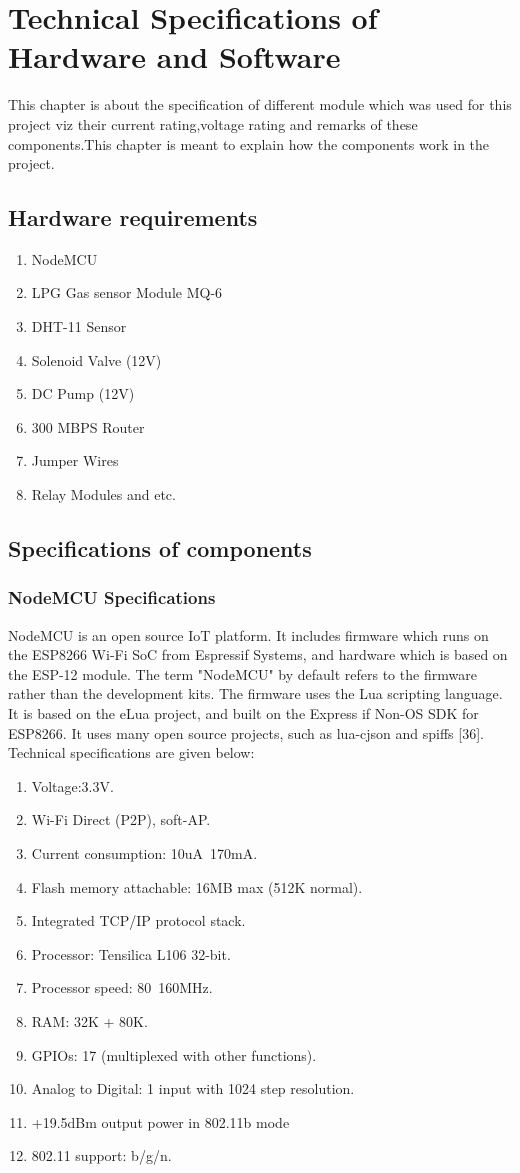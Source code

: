 \chapter{\textbf{Technical Specifications of Hardware and Software}}
This chapter is about the specification of different module which was used for this project viz their current rating,voltage rating and remarks of these components.This chapter is meant to explain how the components work in the project.

\section{Hardware requirements}
\begin{enumerate}
\item	NodeMCU
\item	LPG Gas sensor Module MQ-6
\item	DHT-11 Sensor
\item	Solenoid Valve (12V)
\item   DC Pump (12V)
\item	300 MBPS Router
\item	Jumper Wires
\item	Relay Modules and etc.
\end{enumerate}
\section{Specifications of components}
\subsection{NodeMCU Specifications}
NodeMCU is an open source IoT platform. It includes firmware which runs on the ESP8266 Wi-Fi SoC from Espressif Systems, and hardware which is based on the ESP-12 module. The term "NodeMCU" by default refers to the firmware rather than the development kits. The firmware uses the Lua scripting language. It is based on the eLua project, and built on the Express if Non-OS SDK for ESP8266. It uses many open source projects, such as lua-cjson and spiffs [36]. Technical specifications are given below:

\begin{enumerate}
  \item Voltage:3.3V.
\item	Wi-Fi Direct (P2P), soft-AP.
\item	Current consumption: 10uA~170mA.
\item	Flash memory attachable: 16MB max (512K normal).
\item	Integrated TCP/IP protocol stack.
\item	Processor: Tensilica L106 32-bit.
\item	Processor speed: 80~160MHz.
\item	RAM: 32K + 80K.
\item	GPIOs: 17 (multiplexed with other functions).
\item	Analog to Digital: 1 input with 1024 step resolution.
\item	+19.5dBm output power in 802.11b mode
\item	802.11 support: b/g/n.
\end{enumerate}

